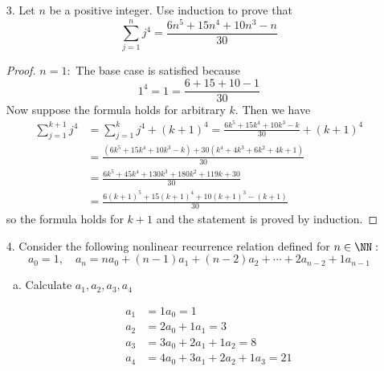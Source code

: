 \documentclass{article}
\begin{document}
\begin{itemize}
\begin{itemize}
		\end{itemize}

	\item[3.] Let $n$ be a positive integer. Use induction to prove that
		\[\sum_{j=1}^{n} j^4=\frac{6n^5+15n^4+10n^3-n}{30}\]
		\begin{proof}
			$n=1:$ The base case is satisfied because
			\[1^4=1=\frac{6+15+10-1}{30}\]
			Now suppose the formula holds for arbitrary $k.$ Then we have
			\begin{align*}
				\sum_{j=1}^{k+1}j^4 &= \sum_{j=1}^{k} j^4+(k+1)^4 = \frac{6k^5+15k^4+10k^3-k}{30} + (k+1)^4 \\
				&= \frac{(6k^5+15k^4+10k^3-k) + 30(k^4+4k^3+6k^2+4k+1)}{30} \\
				&= \frac{6k^5 + 45k^4+130k^3+180k^2+119k+30}{30} \\
				&= \frac{6(k+1)^5+15(k+1)^4+10(k+1)^3-(k+1)}{30}
			\end{align*}
			so the formula holds for $k+1$ and the statement is proved by induction.
		\end{proof}

	\item[4.] Consider the following nonlinear recurrence relation defined for $n\in\NN:$
		\[a_0=1, \quad a_n=na_0+(n-1)a_1+(n-2)a_2+\cdots+2a_{n-2}+1a_{n-1}\]
		\begin{enumerate}[(a)]
			\item Calculate $a_1, a_2, a_3, a_4$
				\begin{soln}
					\begin{align*}
						a_1 &= 1a_0 = 1 \\
						a_2 &= 2a_0+1a_1=3 \\
						a_3 &= 3a_0+2a_1+1a_2 = 8 \\
						a_4 &= 4a_0+3a_1+2a_2+1a_3 = 21
					\end{align*}
				\end{soln}


\end{enumerate}
\end{itemize}
\end{document}
